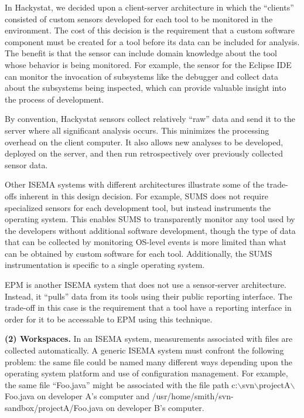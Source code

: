 \documentclass[10pt,twocolumn]{article}
\begin{document}
In Hackystat, we decided upon a client-server architecture in which the
``clients'' consisted of custom sensors developed for each tool to be
monitored in the environment.  The cost of this decision is the requirement
that a custom software component must be created for a tool before its data
can be included for analysis.  The benefit is that the sensor can include
domain knowledge about the tool whose behavior is being monitored. For
example, the sensor for the Eclipse IDE can monitor the invocation of
subsystems like the debugger and collect data about the subsystems being
inspected, which can provide valuable insight into the process of
development.

By convention, Hackystat sensors collect relatively ``raw'' data and send
it to the server where all significant analysis occurs.  This minimizes the
processing overhead on the client computer. It also allows new analyses to
be developed, deployed on the server, and then run retrospectively over
previously collected sensor data.

Other ISEMA systems with different architectures illustrate some of the
trade-offs inherent in this design decision.  For example, SUMS does not
require specialized sensors for each development tool, but instead
instruments the operating system. This enables SUMS to transparently
monitor any tool used by the developers without additional software
development, though the type of data that can be collected by monitoring
OS-level events is more limited than what can be obtained by custom
software for each tool.  Additionally, the SUMS instrumentation is specific
to a single operating system.

EPM is another ISEMA system that does not use a sensor-server architecture.
Instead, it ``pulls'' data from its tools using their public reporting
interface. The trade-off in this case is the requirement that a tool have
a reporting interface in order for it to be accessable to EPM using this
technique.

{\bf (2) Workspaces.}  In an ISEMA system, measurements associated with
files are collected automatically.  A generic ISEMA system must confront
the following problem: the same file could be named many different ways
depending upon the operating system platform and use of configuration management.
For example, the same file ``Foo.java'' might be associated with the
file path c:$\backslash$svn$\backslash$projectA$\backslash$Foo.java on
developer A's computer and /usr/home/smith/svn-sandbox/projectA/Foo.java on
developer B's computer.
\end{document}
